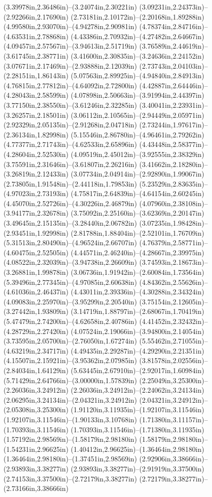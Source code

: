 (3.39978in,2.36486in)--(3.24074in,2.30221in) (3.09231in,2.24373in)--(2.92266in,2.17690in) (2.73181in,2.10172in)--(2.20168in,1.89288in) (4.99580in,2.93070in)--(4.94278in,2.90981in) (4.78374in,2.84716in)--(4.63531in,2.78868in) (4.43386in,2.70932in)--(4.27482in,2.64667in) (4.09457in,2.57567in)--(3.94613in,2.51719in) (3.76589in,2.44619in)--(3.61745in,2.38771in) (3.41600in,2.30835in)--(3.24636in,2.24152in) (3.07671in,2.17469in)--(2.93888in,2.12039in) (2.73743in,2.04103in)--(2.28151in,1.86143in) (5.07563in,2.89925in)--(4.94840in,2.84913in) (4.76815in,2.77812in)--(4.64092in,2.72800in) (4.42887in,2.64446in)--(4.28043in,2.58599in) (4.07898in,2.50663in)--(3.91994in,2.44397in) (3.77150in,2.38550in)--(3.61246in,2.32285in) (3.40041in,2.23931in)--(3.26257in,2.18501in) (3.06112in,2.10565in)--(2.94449in,2.05971in) (2.92329in,2.05135in)--(2.91268in,2.04718in) (2.73244in,1.97617in)--(2.36134in,1.82998in) (5.15546in,2.86780in)--(4.96461in,2.79262in) (4.77377in,2.71743in)--(4.62533in,2.65896in) (4.43448in,2.58377in)--(4.28604in,2.52530in) (4.09519in,2.45012in)--(3.92555in,2.38329in) (3.75591in,2.31646in)--(3.61807in,2.26216in) (3.41662in,2.18280in)--(3.26819in,2.12433in) (3.07734in,2.04914in)--(2.92890in,1.99067in) (2.73805in,1.91548in)--(2.44118in,1.79853in) (5.23529in,2.83635in)--(4.97023in,2.73193in) (4.75817in,2.64839in)--(4.64154in,2.60245in) (4.45070in,2.52726in)--(4.30226in,2.46879in) (4.07960in,2.38108in)--(3.94177in,2.32678in) (3.75092in,2.25160in)--(3.62369in,2.20147in) (3.49645in,2.15135in)--(3.28440in,2.06782in) (3.07235in,1.98428in)--(2.93451in,1.92998in) (2.81788in,1.88404in)--(2.52101in,1.76709in) (5.31513in,2.80490in)--(4.96524in,2.66707in) (4.76379in,2.58771in)--(4.60475in,2.52505in) (4.44571in,2.46240in)--(4.28667in,2.39975in) (4.08522in,2.32039in)--(3.94738in,2.26609in) (3.74593in,2.18673in)--(3.26881in,1.99878in) (3.06736in,1.91942in)--(2.60084in,1.73564in) (5.39496in,2.77345in)--(4.97085in,2.60638in) (4.84362in,2.55626in)--(4.61036in,2.46437in) (4.43011in,2.39336in)--(4.30288in,2.34324in) (4.09083in,2.25970in)--(3.95299in,2.20540in) (3.75154in,2.12605in)--(3.27442in,1.93809in) (3.14719in,1.88797in)--(2.68067in,1.70419in) (5.47479in,2.74200in)--(4.62658in,2.40786in) (4.41452in,2.32432in)--(4.28729in,2.27420in) (4.07524in,2.19066in)--(3.94800in,2.14054in) (3.73595in,2.05700in)--(2.76050in,1.67274in) (5.55462in,2.71055in)--(4.63219in,2.34717in) (4.49435in,2.29287in)--(4.29290in,2.21351in) (4.15507in,2.15921in)--(3.95362in,2.07985in) (3.81578in,2.02556in)--(2.84034in,1.64129in) (5.63445in,2.67910in)--(2.92017in,1.60984in) (5.71429in,2.64766in)--(3.00000in,1.57839in) (2.25049in,3.25300in)--(2.26036in,3.24912in) (2.26036in,3.24912in)--(2.24062in,3.24134in) (2.06295in,3.24134in)--(2.04321in,3.24912in) (2.04321in,3.24912in)--(2.05308in,3.25300in) (1.91120in,3.11935in)--(1.92107in,3.11546in) (1.92107in,3.11546in)--(1.90133in,3.10768in) (1.71380in,3.11157in)--(1.70393in,3.11546in) (1.70393in,3.11546in)--(1.71380in,3.11935in) (1.57192in,2.98569in)--(1.58179in,2.98180in) (1.58179in,2.98180in)--(1.54231in,2.96625in) (1.40412in,2.96625in)--(1.36464in,2.98180in) (1.36464in,2.98180in)--(1.37451in,2.98569in) (2.92906in,3.38666in)--(2.93893in,3.38277in) (2.93893in,3.38277in)--(2.91919in,3.37500in) (2.74153in,3.37500in)--(2.72179in,3.38277in) (2.72179in,3.38277in)--(2.73166in,3.38666in) 